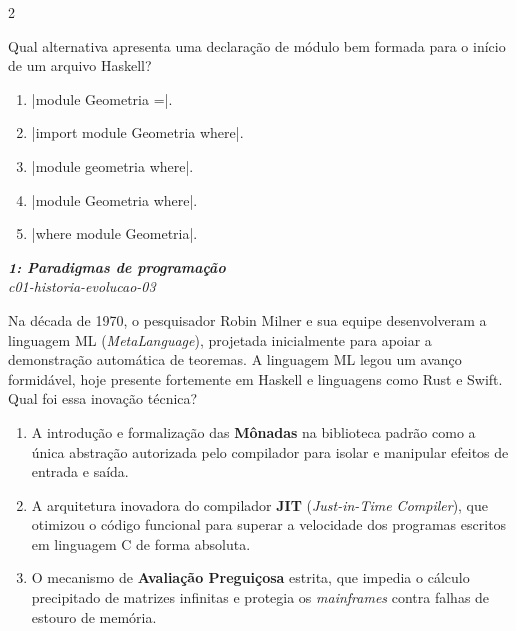 \documentclass[a4paper,10pt,brazil]{article}
\begin{document}
\begin{multicols}{2}
\begin{flushright}
\end{flushright}
Qual alternativa apresenta uma declaração de módulo bem formada para o início de um arquivo Haskell?

\begin{enumerate}
  \item \haskellinline|module Geometria =|.

  \item \haskellinline|import module Geometria where|.

  \item \haskellinline|module geometria where|.

  \item \haskellinline|module Geometria where|.

  \item \haskellinline|where module Geometria|.


\end{enumerate}

\begin{flushright}
  \footnotesize
  \textit{\textbf{1: Paradigmas de programação}}\\
  \textit{c01-historia-evolucao-03}\\

\end{flushright}
Na década de 1970, o pesquisador Robin Milner e sua equipe desenvolveram a linguagem ML (\emph{MetaLanguage}), projetada inicialmente para apoiar a demonstração automática de teoremas. A linguagem ML legou um avanço formidável, hoje presente fortemente em Haskell e linguagens como Rust e Swift. Qual foi essa inovação técnica?

\begin{enumerate}
  \item A introdução e formalização das \textbf{Mônadas} na biblioteca padrão como a única abstração autorizada pelo compilador para isolar e manipular efeitos de entrada e saída.

  \item A arquitetura inovadora do compilador \textbf{JIT} (\emph{Just-in-Time Compiler}), que otimizou o código funcional para superar a velocidade dos programas escritos em linguagem C de forma absoluta.

  \item O mecanismo de \textbf{Avaliação Preguiçosa} estrita, que impedia o cálculo precipitado de matrizes infinitas e protegia os \emph{mainframes} contra falhas de estouro de memória.


\end{enumerate}
\end{multicols}
\end{document}
